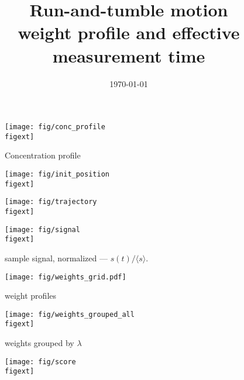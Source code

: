 \documentclass{article}
\title{\huge Run-and-tumble motion \\ \large weight profile and effective measurement time}
\date{\today}
\begin{document}

\maketitle

\noindent\hrulefill
{}
\noindent\hrulefill

\begin{minipage}{0.55\textwidth}
\begin{figure}[H]
\texttt{[image: fig/conc\_profile\\figext]}
\caption{Concentration profile}
\end{figure}
\end{minipage}
\begin{minipage}{0.25\textwidth}
\end{minipage}\hfill

\begin{minipage}{0.48\textwidth}
\begin{figure}[H]
\texttt{[image: fig/init\_position\\figext]}
\end{figure}
\end{minipage}
\begin{minipage}{0.48\textwidth}
\begin{figure}[H]
\texttt{[image: fig/trajectory\\figext]}
\end{figure}
\end{minipage}\hfill


\begin{figure}[H]
\texttt{[image: fig/signal\\figext]}
\caption{sample signal, normalized ---  $s(t)/\langle s \rangle$.}
\hfill
\end{figure}

\begin{figure}[H]
\begin{center}
\hspace*{-1cm}\texttt{[image: fig/weights\_grid.pdf]}
\end{center}
\caption{weight profiles}
\end{figure}

\begin{figure}[H]
\begin{center}
\hspace*{-1cm}\texttt{[image: fig/weights\_grouped\_all\\figext]}
\end{center}
\caption{weights grouped by $\lambda$}
\end{figure}

\begin{figure}[H]
\texttt{[image: fig/score\\figext]}
\end{figure}
\end{document}
